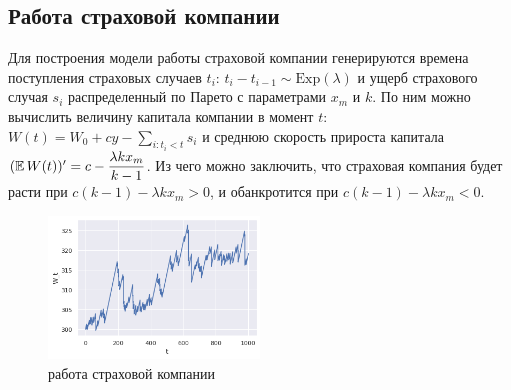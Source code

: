\subsection{Работа страховой компании}
    Для построения модели работы страховой компании генерируются времена 
    поступления страховых случаев $t_i$: $t_i - t_{i-1} \sim 
    \mathrm{Exp}(\lambda)$ и ущерб страхового случая $s_i$ распределенный по 
    Парето с параметрами $x_m$ и $k$. По ним можно вычислить величину капитала 
    компании в момент $t$: $W(t) = W_0 + cy - \sum_{i:t_i<t} s_i$ и среднюю 
    скорость прироста капитала $(\operatorname{\mathbb{E}} W(t))' = c - \dfrac{\lambda k x_m}{k-1}$.
    Из чего можно заключить, что страховая компания будет расти при 
    $c(k-1)-\lambda k x_m > 0$, и обанкротится при $c(k-1)-\lambda k x_m < 0$.

    \begin{figure}[tbp]
        \centering
        \includegraphics[width=0.5\textwidth]{resources/task11_insur_comp.png}
        \caption{работа страховой компании}
        \label{ins_comp}
    \end{figure}
